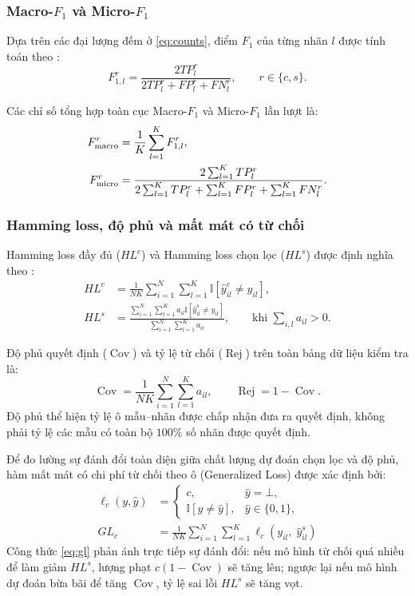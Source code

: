\documentclass[11pt,a4paper]{article}
\DeclareMathOperator{\Cov}{Cov}
\begin{document}
\subsubsection{Macro-\texorpdfstring{$F_1$}{F1} và Micro-\texorpdfstring{$F_1$}{F1}}
Dựa trên các đại lượng đếm ở \eqref{eq:counts}, điểm $F_1$ của từng nhãn $l$ được tính toán theo \cite{zhang2014,bogatinovski2022}:
\begin{equation}
F_{1,l}^r = \frac{2TP_l^r}{2TP_l^r + FP_l^r + FN_l^r}, \qquad r \in \{c, s\}.
\label{eq:f1label}
\end{equation}

Các chỉ số tổng hợp toàn cục Macro-$F_1$ và Micro-$F_1$ lần lượt là:
\begin{align}
F_{\rm macro}^r &= \frac{1}{K}\sum_{l=1}^{K}F_{1,l}^r, \label{eq:macro} \\
F_{\rm micro}^r &= \frac{2\sum_{l=1}^K TP_l^r}{2\sum_{l=1}^K TP_l^r + \sum_{l=1}^K FP_l^r + \sum_{l=1}^K FN_l^r}. \label{eq:micro}
\end{align}

\subsubsection{Hamming loss, độ phủ và mất mát có từ chối}
Hamming loss đầy đủ ($HL^c$) và Hamming loss chọn lọc ($HL^s$) được định nghĩa theo \cite{zhang2014}:
\begin{align}
HL^c &= \frac{1}{NK}\sum_{i=1}^N\sum_{l=1}^K \mathbb I\left[\hat y^c_{il} \ne y_{il}\right], \label{eq:hl} \\
HL^s &= \frac{\sum_{i=1}^N\sum_{l=1}^K a_{il} \mathbb I\left[\hat y^s_{il} \ne y_{il}\right]}{\sum_{i=1}^N\sum_{l=1}^K a_{il}}, \qquad \text{khi } \sum_{i,l}a_{il} > 0. \label{eq:shl}
\end{align}

Độ phủ quyết định ($\Cov$) và tỷ lệ từ chối ($\operatorname{Rej}$) trên toàn bảng dữ liệu kiểm tra là:
\begin{equation}
\Cov = \frac{1}{NK}\sum_{i=1}^N\sum_{l=1}^K a_{il}, \qquad \operatorname{Rej} = 1 - \Cov.
\label{eq:cov}
\end{equation}
Độ phủ thể hiện tỷ lệ ô mẫu--nhãn được chấp nhận đưa ra quyết định, không phải tỷ lệ các mẫu có toàn bộ $100\%$ số nhãn được quyết định.

Để đo lường sự đánh đổi toàn diện giữa chất lượng dự đoán chọn lọc và độ phủ, hàm mất mát có chi phí từ chối theo ô (Generalized Loss) \cite{chow1970,nguyen2021} được xác định bởi:
\begin{align}
\ell_c(y, \hat y) &=
\begin{cases}
c, & \hat y = \bot, \\
\mathbb I[y \ne \hat y], & \hat y \in \{0, 1\},
\end{cases} \nonumber \\
GL_c &= \frac{1}{NK}\sum_{i=1}^N\sum_{l=1}^K \ell_c\left(y_{il}, \; \hat y^s_{il}\right) \label{eq:gl}
\end{align}
Công thức \eqref{eq:gl} phản ánh trực tiếp sự đánh đổi: nếu mô hình từ chối quá nhiều để làm giảm $HL^s$, lượng phạt $c(1-\Cov)$ sẽ tăng lên; ngược lại nếu mô hình dự đoán bừa bãi để tăng $\Cov$, tỷ lệ sai lỗi $HL^s$ sẽ tăng vọt.
\end{document}
